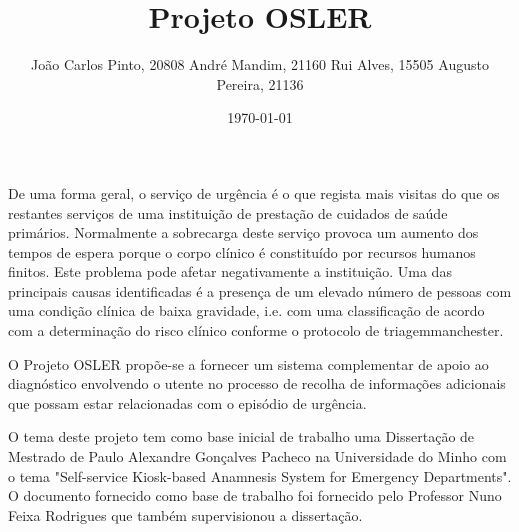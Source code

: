 \documentclass[a4paper,12pt,twoside]{book}
\title{Projeto OSLER}
\author{João Carlos Pinto, 20808 \AND André Mandim, 21160 \AND Rui Alves, 15505 \AND Augusto Pereira, 21136}
\date{\today}
\begin{document}



\frontmatter
\maketitle  %

\begin{resumo}
De uma forma geral, o serviço de urgência é o que regista mais visitas do que os restantes serviços de uma instituição de prestação de cuidados de saúde primários. Normalmente a sobrecarga deste serviço provoca um aumento dos tempos de espera porque o corpo clínico é constituído por recursos humanos finitos. Este problema pode afetar negativamente a instituição. Uma das principais causas identificadas é a presença de um elevado número de pessoas com uma condição clínica de baixa gravidade, i.e. com uma classificação de acordo com a determinação do risco clínico conforme o protocolo de \gls{triagemmanchester}.  
  
O Projeto OSLER propõe-se a fornecer um sistema complementar de apoio ao diagnóstico envolvendo o utente no processo de recolha de informações adicionais que possam estar relacionadas com o episódio de urgência.  
  
O tema deste projeto tem como base inicial de trabalho uma Dissertação de Mestrado de Paulo Alexandre Gonçalves Pacheco na Universidade do Minho com o tema "Self-service Kiosk-based Anamnesis System for Emergency Departments". O documento fornecido como base de trabalho foi fornecido pelo Professor Nuno Feixa Rodrigues que também supervisionou a dissertação.  
\end{resumo}



\tableofcontents

\mainmatter
\end{document}
